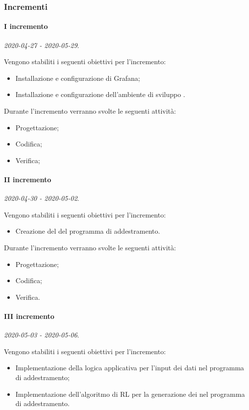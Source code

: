 \documentclass[../piano-di-progetto.tex]{subfiles}
\begin{document}
\subsubsection{Incrementi}

\paragraph{I incremento}
\emph{2020-04-27 - 2020-05-29}. 
 
 Vengono stabiliti i seguenti obiettivi per l'incremento:
 \begin{itemize}
     \item Installazione e configurazione di Grafana;
     \item Installazione e configurazione dell'ambiente di sviluppo .
 \end{itemize}

Durante l'incremento verranno svolte le seguenti attività: 
\begin{itemize}
    \item Progettazione;
    \item Codifica;
    \item Verifica;
\end{itemize}

\paragraph{II incremento}
\emph{2020-04-30 - 2020-05-02}. 
 
 Vengono stabiliti i seguenti obiettivi per l'incremento:
 \begin{itemize}
     \item Creazione del  del programma di addestramento.
 \end{itemize}

Durante l'incremento verranno svolte le seguenti attività: 
\begin{itemize}
    \item Progettazione;
    \item Codifica;
    \item Verifica.
\end{itemize}


\paragraph{III incremento}
\emph{2020-05-03 - 2020-05-06}. 
 
 Vengono stabiliti i seguenti obiettivi per l'incremento:
 \begin{itemize}
     \item Implementazione della logica applicativa per l'input dei dati nel programma di addestramento;
     \item Implementazione dell'algoritmo di RL per la generazione dei  nel programma di addestramento.
 \end{itemize}
\end{document}
